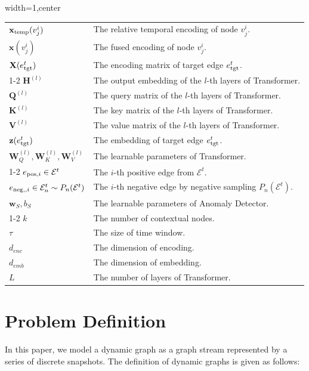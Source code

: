 \documentclass[10pt,journal,compsoc]{IEEEtran}
\begin{document}
\begin{table}[t]
\begin{adjustbox}{width=1\columnwidth,center}
\begin{tabular}{ l|l}
$\mathbf{x}_{\rm temp}(v_j^i)$ & The relative temporal encoding of node $v_j^i$. \\
$\mathbf{x}(v_j^i)$ & The fused encoding of node $v_j^i$. \\
$\mathbf{X}(e^t_{\rm tgt})$ & The encoding matrix of target edge $e_{\rm tgt}^t$. \\
\cmidrule{1-2}
$\mathbf{H}^{(l)}$ & The output embedding of the $l$-th layers of Transformer. \\
$\mathbf{Q}^{(l)}$ & The query matrix of the $l$-th layers of Transformer. \\
$\mathbf{K}^{(l)}$ & The key matrix of the $l$-th layers of Transformer. \\
$\mathbf{V}^{(l)}$ & The value matrix of the $l$-th layers of Transformer. \\
$\mathbf{z}(e_{\rm tgt}^t)$ & The embedding of target edge $e_{\rm tgt}^t$. \\
$\mathbf{W}_{Q}^{(l)}, \mathbf{W}_{K}^{(l)}, \mathbf{W}_{V}^{(l)}$ & The learnable parameters of Transformer. \\
\cmidrule{1-2}
$e_{{\rm pos},i} \in \mathcal{E}^t$ & The $i$-th positive edge from $\mathcal{E}^t$. \\
$e_{{\rm neg},,i} \in \mathcal{E}^t_n \sim P_{n}(\mathcal{E}^t)$ & The $i$-th negative edge by negative sampling $P_{n}(\mathcal{E}^t)$. \\
$\mathbf{w}_S, b_S$ & The learnable parameters of Anomaly Detector. \\
\cmidrule{1-2}
$k$ & The number of contextual nodes. \\
$\tau$ & The size of time window. \\
$d_{enc}$ & The dimension of encoding. \\
$d_{emb}$ & The dimension of embedding. \\
$L$ & The number of layers of Transformer. \\
\bottomrule[1.0pt]
\end{tabular}
\end{adjustbox}
\vspace{-0.2cm}
\label{table:notation}
\end{table}

\section{Problem Definition} \label{sec:definition}

In this paper, we model a dynamic graph as a graph stream represented by a series of discrete snapshots. The definition of dynamic graphs is given as follows:
\end{document}
